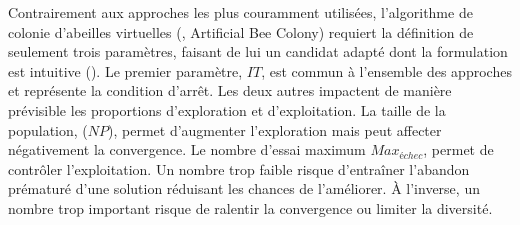 Contrairement aux approches les plus couramment utilisées, l’algorithme de
colonie d’abeilles virtuelles (, Artificial Bee Colony) requiert la
définition de seulement trois paramètres, faisant de lui un candidat adapté dont
la formulation est intuitive (). Le premier paramètre,
$IT$, est commun à l’ensemble des approches et représente la condition d’arrêt.
Les deux autres impactent de manière prévisible les proportions d’exploration et
d’exploitation. La taille de la population, ($NP$), permet d’augmenter
l’exploration mais peut affecter négativement la convergence. Le nombre
d’essai maximum $Max_{échec}$, permet de contrôler l’exploitation. Un nombre
trop faible risque d’entraîner l’abandon prématuré d’une solution réduisant les chances de
l’améliorer. À l’inverse, un nombre trop important risque de ralentir la convergence
ou limiter la diversité.


